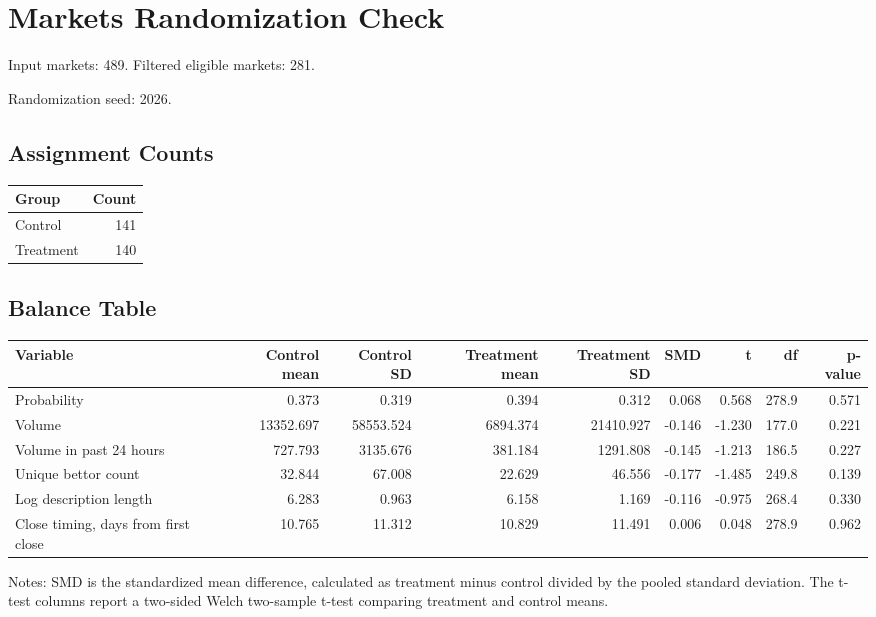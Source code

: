 \documentclass{article}
\begin{document}
\section*{Markets Randomization Check}

Input markets: 489. Filtered eligible markets: 281.

Randomization seed: 2026.

\subsection*{Assignment Counts}
\begin{tabular}{lr}
\toprule
Group & Count \\
\midrule
Control & 141 \\
Treatment & 140 \\
\bottomrule
\end{tabular}

\subsection*{Balance Table}
\begin{tabular}{lrrrrrrrr}
\toprule
Variable & Control mean & Control SD & Treatment mean & Treatment SD & SMD & t & df & p-value \\
\midrule
Probability & 0.373 & 0.319 & 0.394 & 0.312 & 0.068 & 0.568 & 278.9 & 0.571 \\
Volume & 13352.697 & 58553.524 & 6894.374 & 21410.927 & -0.146 & -1.230 & 177.0 & 0.221 \\
Volume in past 24 hours & 727.793 & 3135.676 & 381.184 & 1291.808 & -0.145 & -1.213 & 186.5 & 0.227 \\
Unique bettor count & 32.844 & 67.008 & 22.629 & 46.556 & -0.177 & -1.485 & 249.8 & 0.139 \\
Log description length & 6.283 & 0.963 & 6.158 & 1.169 & -0.116 & -0.975 & 268.4 & 0.330 \\
Close timing, days from first close & 10.765 & 11.312 & 10.829 & 11.491 & 0.006 & 0.048 & 278.9 & 0.962 \\
\bottomrule
\end{tabular}

Notes: SMD is the standardized mean difference, calculated as treatment minus control divided by the pooled standard deviation. The t-test columns report a two-sided Welch two-sample t-test comparing treatment and control means.
\end{document}
